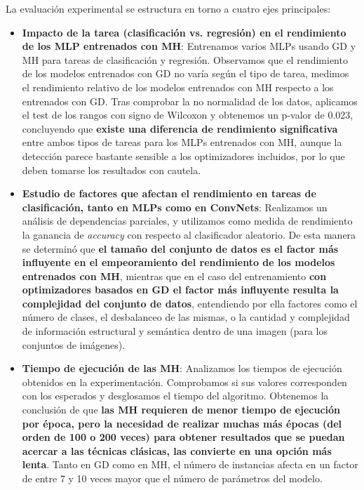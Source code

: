 La evaluación experimental se estructura en torno a cuatro ejes principales:

\begin{itemize}

\item \textbf{Impacto de la tarea (clasificación vs. regresión) en el rendimiento de los MLP entrenados con MH}: Entrenamos varios MLPs usando GD y MH para tareas de clasificación y regresión. Observamos que el rendimiento de los modelos entrenados con GD no varía según el tipo de tarea, medimos el rendimiento relativo de los modelos entrenados con MH respecto a los entrenados con GD. Tras comprobar la no normalidad de los datos, aplicamos el test de los rangos con signo de Wilcoxon y obtenemos un p-valor de 0.023, concluyendo que \textbf{existe una diferencia de rendimiento significativa} entre ambos tipos de tareas para los MLPs entrenados con MH, aunque la detección parece bastante sensible a los optimizadores incluidos, por lo que deben tomarse los resultados con cautela.

\item \textbf{Estudio de factores que afectan el rendimiento en tareas de clasificación, tanto en MLPs como en ConvNets}: Realizamos un análisis de dependencias parciales, y utilizamos como medida de rendimiento la ganancia de \textit{accuracy} con respecto al clasificador aleatorio. De esta manera se determinó que \textbf{el tamaño del conjunto de datos es el factor más influyente en el empeoramiento del rendimiento de los modelos entrenados con MH}, mientras que en el caso del entrenamiento \textbf{con optimizadores basados en GD el factor más influyente resulta la complejidad del conjunto de datos}, entendiendo por ella factores como el número de clases, el desbalanceo de las mismas, o la cantidad y complejidad de información estructural y semántica dentro de una imagen (para los conjuntos de imágenes).

\item \textbf{Tiempo de ejecución de las MH}: Analizamos los tiempos de ejecución obtenidos en la experimentación. Comprobamos si sus valores corresponden con los esperados y desglosamos el tiempo del algoritmo. Obtenemos la conclusión de que \textbf{las MH requieren de menor tiempo de ejecución por época, pero la necesidad de realizar muchas más épocas (del orden de 100 o 200 veces) para obtener resultados que se puedan acercar a las técnicas clásicas, las convierte en una opción más lenta}. Tanto en GD como en MH, el número de instancias afecta en un factor de entre 7 y 10 veces mayor que el número de parámetros del modelo.


\end{itemize}

